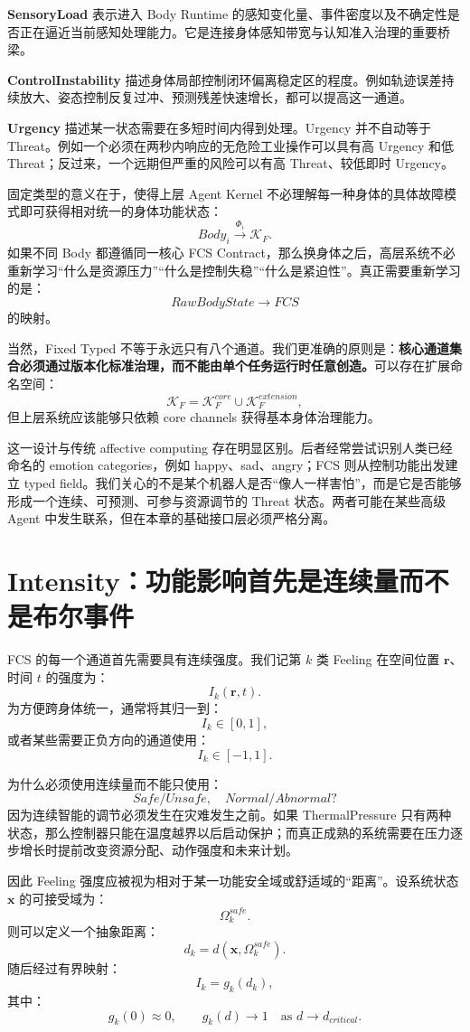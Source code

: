 \textbf{SensoryLoad} 表示进入 Body Runtime 的感知变化量、事件密度以及不确定性是否正在逼近当前感知处理能力。它是连接身体感知带宽与认知准入治理的重要桥梁。

\textbf{ControlInstability} 描述身体局部控制闭环偏离稳定区的程度。例如轨迹误差持续放大、姿态控制反复过冲、预测残差快速增长，都可以提高这一通道。

\textbf{Urgency} 描述某一状态需要在多短时间内得到处理。Urgency 并不自动等于 Threat。例如一个必须在两秒内响应的无危险工业操作可以具有高 Urgency 和低 Threat；反过来，一个远期但严重的风险可以有高 Threat、较低即时 Urgency。

固定类型的意义在于，使得上层 Agent Kernel 不必理解每一种身体的具体故障模式即可获得相对统一的身体功能状态：
\[
Body_i
\xrightarrow{\Phi_i}
\mathcal K_F.
\]
如果不同 Body 都遵循同一核心 FCS Contract，那么换身体之后，高层系统不必重新学习“什么是资源压力”“什么是控制失稳”“什么是紧迫性”。真正需要重新学习的是：
\[
RawBodyState
\rightarrow
FCS
\]
的映射。

当然，Fixed Typed 不等于永远只有八个通道。我们更准确的原则是：\textbf{核心通道集合必须通过版本化标准治理，而不能由单个任务运行时任意创造。}可以存在扩展命名空间：
\[
\mathcal K_F
=
\mathcal K_F^{core}
\cup
\mathcal K_F^{extension},
\]
但上层系统应该能够只依赖 core channels 获得基本身体治理能力。

这一设计与传统 affective computing 存在明显区别。后者经常尝试识别人类已经命名的 emotion categories，例如 happy、sad、angry；FCS 则从控制功能出发建立 typed field。我们关心的不是某个机器人是否“像人一样害怕”，而是它是否能够形成一个连续、可预测、可参与资源调节的 Threat 状态。两者可能在某些高级 Agent 中发生联系，但在本章的基础接口层必须严格分离。

\section{Intensity：功能影响首先是连续量而不是布尔事件}

FCS 的每一个通道首先需要具有连续强度。我们记第 $k$ 类 Feeling 在空间位置 $\mathbf r$、时间 $t$ 的强度为：
\[
I_k(\mathbf r,t).
\]
为方便跨身体统一，通常将其归一到：
\[
I_k\in[0,1],
\]
或者某些需要正负方向的通道使用：
\[
I_k\in[-1,1].
\]

为什么必须使用连续量而不能只使用：
\[
Safe/Unsafe,
\quad
Normal/Abnormal?
\]
因为连续智能的调节必须发生在灾难发生之前。如果 ThermalPressure 只有两种状态，那么控制器只能在温度越界以后启动保护；而真正成熟的系统需要在压力逐步增长时提前改变资源分配、动作强度和未来计划。

因此 Feeling 强度应被视为相对于某一功能安全域或舒适域的“距离”。设系统状态 $\mathbf x$ 的可接受域为：
\[
\Omega_k^{safe}.
\]
则可以定义一个抽象距离：
\[
d_k
=
d
(
\mathbf x,
\Omega_k^{safe}
).
\]
随后经过有界映射：
\[
I_k
=
g_k(d_k),
\]
其中：
\[
g_k(0)\approx0,
\qquad
g_k(d)\to1
\quad
\text{as }
d\to d_{critical}.
\]

